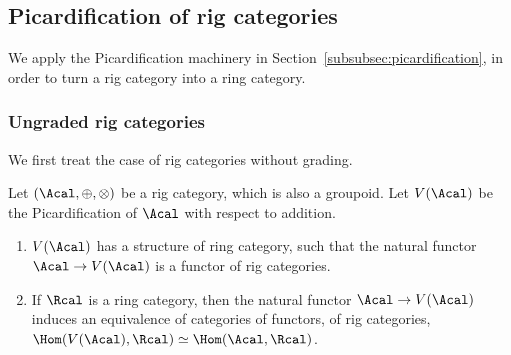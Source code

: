 \subsection{Picardification of rig categories}
We apply the Picardification machinery in Section~\ref{subsubsec:picardification}, in order to turn a rig category into a ring category.
\subsubsection{Ungraded rig categories}
We first treat the case of rig categories without grading.
\begin{proposition}\label{prop:rig-to-ring-1}
Let $(\Acal,\oplus,\otimes)$ be a rig category, which is also a groupoid. Let $V(\Acal)$ be the Picardification of $\Acal$ with respect to addition.
\begin{enumerate}
\item $V(\Acal)$ has a structure of ring category, such that the natural functor $\Acal\to V(\Acal)$ is a functor of rig categories.
\item If $\Rcal$ is a ring category, then the natural functor $\Acal\to V(\Acal)$ induces an equivalence of categories of functors, of rig categories, $\Hom(V(\Acal),\Rcal)\simeq\Hom (\Acal,\Rcal)$.
\end{enumerate}
\end{proposition}
